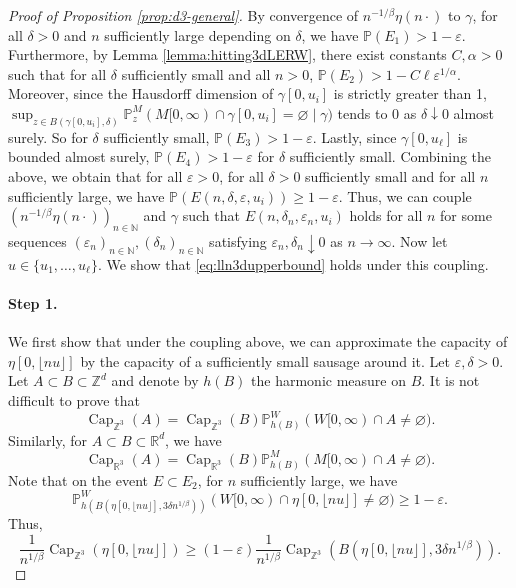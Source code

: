 \documentclass{article}
\DeclareMathOperator{\Ca}{Cap}
\newcommand{\R}{\mathbb{R}}
\newcommand{\Z}{\mathbb{Z}}
\newcommand{\N}{\mathbb{N}}
\renewcommand{\P}{\mathbb{P}}
\newcommand{\1}{\mathbf{1}}
\theoremstyle{definition}
\numberwithin{equation}{section}
\numberwithin{theorem}{section}
\begin{document}
\begin{proof}[Proof of Proposition \ref{prop:d3-general}]
By convergence of $n^{-1/\beta}\eta(n\cdot)$ to $\gamma$, for all $\delta>0$ and $n$ sufficiently large depending on $\delta$, we have $\P(E_1)>1-\varepsilon$. Furthermore, by Lemma \ref{lemma:hitting3dLERW}, there exist constants $C,\alpha>0$ such that for all $\delta$ sufficiently small and all $n>0$, $\P(E_2)>1-C\ell\varepsilon^{1/\alpha}$. Moreover, since the Hausdorff dimension of $\gamma[0,u_i]$ is strictly greater than 1, $\sup_{z\in B(\gamma[0,u_i],\delta)}\P^M_z(M[0,\infty)\cap \gamma[0,u_i]=\varnothing\mid\gamma)$ tends to 0 as $\delta\downarrow 0$ almost surely. So for $\delta$ sufficiently small, $\P(E_3)>1-\varepsilon$. Lastly, since $\gamma[0,u_{\ell}]$ is bounded almost surely, $\P(E_4)>1-\varepsilon$ for $\delta$ sufficiently small. Combining the above, we obtain that for all $\varepsilon>0$, for all $\delta>0$ sufficiently small and for all $n$ sufficiently large, we have $\P(E(n,\delta,\varepsilon,u_i))\geq1-\varepsilon$. Thus, we can couple $(n^{-1/\beta}\eta(n\cdot))_{n\in\N}$ and $\gamma$ such that $E(n,\delta_n,\varepsilon_n,u_i)$ holds for all $n$ for some sequences $(\varepsilon_n)_{n\in\N},(\delta_n)_{n\in\N}$ satisfying $\varepsilon_n,\delta_n\downarrow0$ as $n\rightarrow\infty$. Now let $u\in\{u_1,\ldots,u_{\ell}\}$. We show that \eqref{eq:lln3dupperbound} holds under this coupling.


\paragraph{Step 1.}
We first show that under the coupling above, we can approximate the capacity of $\eta[0,\lfloor nu\rfloor]$ by the capacity of a sufficiently small sausage around it. Let $\varepsilon,\delta>0$. Let $A\subset B\subset\Z^d$ and denote by $h(B)$ the harmonic measure on $B$. It is not difficult to prove that
\begin{equation}\label{eq:capacitysubsetZd}
    \Ca_{\Z^3}(A)=\Ca_{\Z^3}(B)\P_{h(B)}^W(W[0,\infty)\cap A\neq\varnothing).
\end{equation}
Similarly, for $A\subset B\subset\R^d$, we have
\begin{equation}\label{eq:capacitysubsetRd}
    \Ca_{\R^3}(A)=\Ca_{\R^3}(B)\P_{h(B)}^M(M[0,\infty)\cap A\neq\varnothing).
\end{equation}
Note that on the event $E\subset E_2$, for $n$ sufficiently large, we have
\begin{equation}
    \P_{h(B(\eta[0,\lfloor nu\rfloor],3\delta n^{1/\beta}))}^W(W[0,\infty)\cap \eta[0,\lfloor nu\rfloor]\neq\varnothing)\geq 1-\varepsilon.
\end{equation}
Thus, 
\begin{equation}
    \frac{1}{n^{1/\beta}}\Ca_{\Z^3}(\eta[0,\lfloor nu\rfloor])\geq (1-\varepsilon)\frac{1}{n^{1/\beta}}\Ca_{\Z^3}(B(\eta[0,\lfloor nu\rfloor],3\delta n^{1/\beta})).
\end{equation}


\end{proof}
\end{document}
